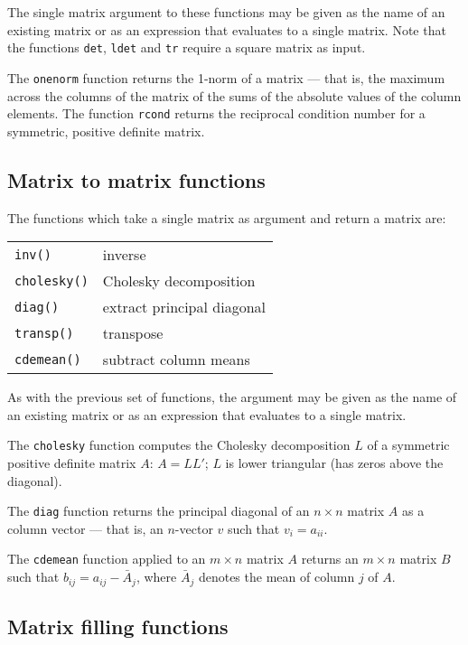 The single matrix argument to these functions may be given as the name
of an existing matrix or as an expression that evaluates to a single
matrix.  Note that the functions \texttt{det}, \texttt{ldet} and
\texttt{tr} require a square matrix as input.  

The \texttt{onenorm} function returns the 1-norm of a matrix --- that
is, the maximum across the columns of the matrix of the sums of the
absolute values of the column elements.  The function \texttt{rcond}
returns the reciprocal condition number for a symmetric, positive
definite matrix.

\subsection{Matrix to matrix functions}
\label{matrix-to-matrix}

The functions which take a single matrix as argument and return a
matrix are:

\begin{center}
\begin{tabular}{ll}
\texttt{inv()} & inverse \\
\texttt{cholesky()} & Cholesky decomposition \\
\texttt{diag()} & extract principal diagonal \\
\texttt{transp()} & transpose \\
\texttt{cdemean()} & subtract column means 
\end{tabular}
\end{center}

As with the previous set of functions, the argument may be given as
the name of an existing matrix or as an expression that evaluates to a
single matrix.

The \texttt{cholesky} function computes the Cholesky decomposition $L$
of a symmetric positive definite matrix $A$: $A = LL'$; $L$ is lower
triangular (has zeros above the diagonal).  

The \texttt{diag} function returns the principal diagonal of an
$n\times n$ matrix $A$ as a column vector --- that is, an
$n$-vector $v$ such that $v_i = a_{ii}$.

The \texttt{cdemean} function applied to an $m \times n$ matrix $A$
returns an $m \times n$ matrix $B$ such that $b_{ij} = a_{ij} -
\bar{A}_j$, where $\bar{A}_j$ denotes the mean of column $j$ of $A$.  

\subsection{Matrix filling functions}
\label{matrix-fill}


